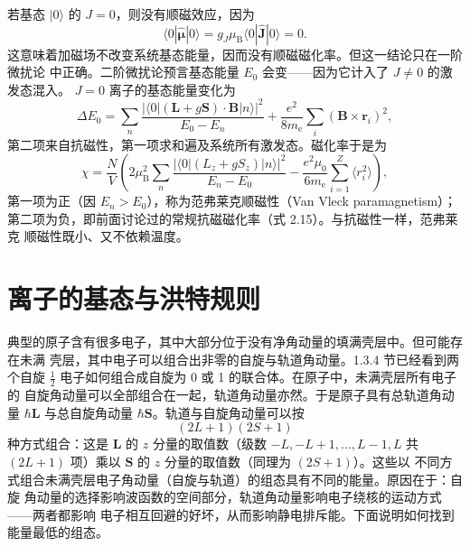 若基态 $|0\rangle$ 的 $J=0$，则没有顺磁效应，因为
\begin{equation*}
\langle 0|\hat{\boldsymbol{\mu}}|0\rangle = g_J\mu_{\mathrm{B}}\langle 0|\hat{\mathbf{J}}|0\rangle = 0.\tag{2.47}
\end{equation*}
这意味着加磁场不改变系统基态能量，因而没有顺磁磁化率。但这一结论只在一阶微扰论
中正确。二阶微扰论预言基态能量 $E_0$ 会变——因为它计入了 $J\neq0$ 的激发态混入。
$J=0$ 离子的基态能量变化为
\begin{equation*}
\Delta E_0 = \sum_n\frac{|\langle 0|(\mathbf{L}+g\mathbf{S})\cdot\mathbf{B}|n\rangle|^{2}}{E_0-E_n} + \frac{e^{2}}{8m_{\mathrm{e}}}\sum_i(\mathbf{B}\times\mathbf{r}_i)^{2},\tag{2.48}
\end{equation*}
第二项来自抗磁性，第一项求和遍及系统所有激发态。磁化率于是为
\begin{equation*}
\chi = \frac{N}{V}\left(2\mu_{\mathrm{B}}^{2}\sum_n\frac{|\langle 0|(L_z+gS_z)|n\rangle|^{2}}{E_n-E_0} - \frac{e^{2}\mu_0}{6m_{\mathrm{e}}}\sum_{i=1}^{Z}\langle r_i^{2}\rangle\right),\tag{2.49}
\end{equation*}
第一项为正（因 $E_n>E_0$），称为范弗莱克顺磁性（Van Vleck paramagnetism）；
第二项为负，即前面讨论过的常规抗磁磁化率（式 2.15）。与抗磁性一样，范弗莱克
顺磁性既小、又不依赖温度。

\section{离子的基态与洪特规则}

典型的原子含有很多电子，其中大部分位于没有净角动量的填满壳层中。但可能存在未满
壳层，其中电子可以组合出非零的自旋与轨道角动量。1.3.4 节已经看到两个自旋
$\frac{1}{2}$ 电子如何组合成自旋为 0 或 1 的联合体。在原子中，未满壳层所有电子的
自旋角动量可以全部组合在一起，轨道角动量亦然。于是原子具有总轨道角动量
$\hbar\mathbf{L}$ 与总自旋角动量 $\hbar\mathbf{S}$。轨道与自旋角动量可以按
\begin{equation*}
(2L+1)(2S+1)\tag{2.50}
\end{equation*}
种方式组合：这是 $\mathbf{L}$ 的 $z$ 分量的取值数（级数 $-L,-L+1,\ldots,L-1,L$
共 $(2L+1)$ 项）乘以 $\mathbf{S}$ 的 $z$ 分量的取值数（同理为 $(2S+1)$）。这些以
不同方式组合未满壳层电子角动量（自旋与轨道）的组态具有不同的能量。原因在于：自旋
角动量的选择影响波函数的空间部分，轨道角动量影响电子绕核的运动方式——两者都影响
电子相互回避的好坏，从而影响静电排斥能。下面说明如何找到能量最低的组态。

